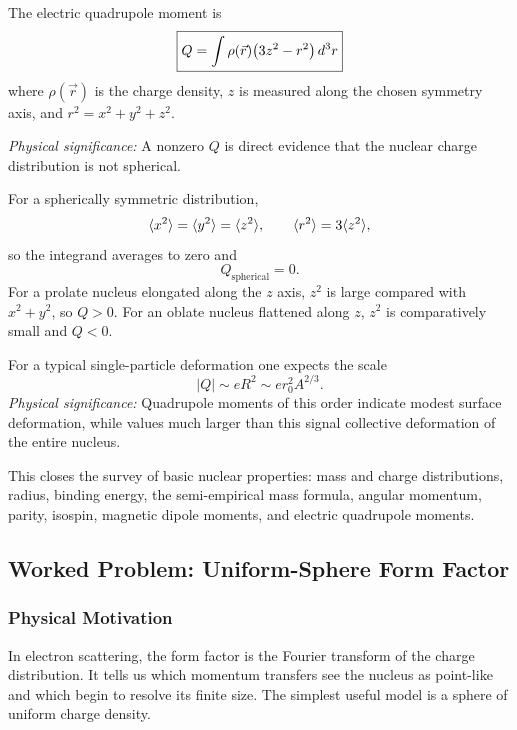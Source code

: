 The electric quadrupole moment is
\begin{equation}\label{eq:lec03:quadrupole_moment_tail}
  \boxed{
  Q = \int \rho(\vec{r})\qty(3z^2-r^2)\,d^3r
  }
\end{equation}
where $\rho(\vec{r})$ is the charge density, $z$ is measured along the chosen symmetry axis, and $r^2=x^2+y^2+z^2$.

\textit{Physical significance:} A nonzero $Q$ is direct evidence that the nuclear charge distribution is not spherical.

For a spherically symmetric distribution,
\[
  \langle x^2 \rangle=\langle y^2 \rangle=\langle z^2 \rangle,
  \qquad
  \langle r^2 \rangle=3\langle z^2 \rangle,
\]
so the integrand averages to zero and
\[
  Q_{\text{spherical}}=0.
\]
For a prolate nucleus elongated along the $z$ axis, $z^2$ is large compared with $x^2+y^2$, so $Q>0$.  For an oblate nucleus flattened along $z$, $z^2$ is comparatively small and $Q<0$.

For a typical single-particle deformation one expects the scale
\begin{equation}\label{eq:lec03:quadrupole_scale}
  \boxed{
  |Q| \sim eR^2 \sim e r_0^2 A^{2/3}.
  }
\end{equation}
\textit{Physical significance:} Quadrupole moments of this order indicate modest surface deformation, while values much larger than this signal collective deformation of the entire nucleus.

This closes the survey of basic nuclear properties: mass and charge distributions, radius, binding energy, the semi-empirical mass formula, angular momentum, parity, isospin, magnetic dipole moments, and electric quadrupole moments.

\subsection*{Worked Problem: Uniform-Sphere Form Factor}

\subsubsection*{Physical Motivation}
In electron scattering, the form factor is the Fourier transform of the charge distribution.  It tells us which momentum transfers see the nucleus as point-like and which begin to resolve its finite size.  The simplest useful model is a sphere of uniform charge density.

